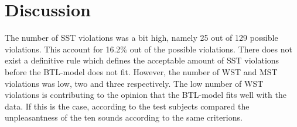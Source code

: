 \section*{Discussion}
\label{Discussion}
%
The number of SST violations was a bit high, namely 25 out of 129 possible violations. This account for 16.2\% out of the possible violations. There does not exist a definitive rule which defines the acceptable amount of SST violations before the BTL-model does not fit. However, the number of WST and MST violations was low, two and three respectively. The low number of WST violations is contributing to the opinion that the BTL-model fits well with the data. If this is the case, according to \textcite[p. 213]{Zimmer2003} the test subjects compared the unpleasantness of the ten sounds according to the same criterions. 
